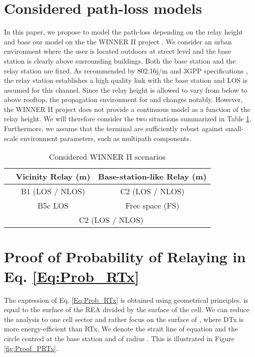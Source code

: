 \documentclass[journal]{IEEEtran}
\theoremstyle{definition}
\begin{document}
\appendices


\section{Considered path-loss models}
\label{App:pathloss}

In this paper, we propose to model the path-loss depending on the relay height and base our model on the the WINNER II project \cite{winner}. 
We consider an urban environment where the user is located outdoors at street level and the base station is clearly above surrounding buildings.
Both the base station and the relay station are fixed. As recommended by 802.16j/m and 3GPP specifications \cite{hr_LOS}, the relay station establishes a high quality link with the base station and LOS is assumed for this channel. Since the relay height is allowed to vary from below to above rooftop, the propagation environment for  and  changes notably. However, the WINNER II project does not provide a continuous model as a function of the relay height. We will therefore consider the two situations summarized in Table \ref{sim_pathloss}.
Furthermore, we assume that the terminal are sufficiently robust against small-scale environment parameters, such as multipath components.


\begin{table}
\centering  \begin{tabular}{|c|c|c|} 
\hline
& Vicinity Relay (m) & Base-station-like Relay (m)\\
\hline
 & B1 (LOS / NLOS) &  C2 (LOS / NLOS)\\
 & B5c LOS & Free space (FS) \\
 &\multicolumn{2}{|c|}{C2 (LOS / NLOS)} \\
\hline
\end{tabular}
\caption{Considered WINNER II scenarios} 
\label{sim_pathloss}
\end{table}

\section{Proof of Probability of Relaying in Eq. \eqref{Eq:Prob_RTx}}
\label{appendix:P_RTx}

The expression of Eq. \eqref{Eq:Prob_RTx} is obtained using geometrical principles.   is equal to the surface of the REA divided by the surface of the cell. We can reduce the analysis to one cell sector and rather focus on the surface of , where DTx is more energy-efficient than RTx.
We denote  the strait line of equation  and  the circle centred at the base station and of radius .
This is illustrated in Figure \ref{fig:Proof_PRTx}.
\end{document}
